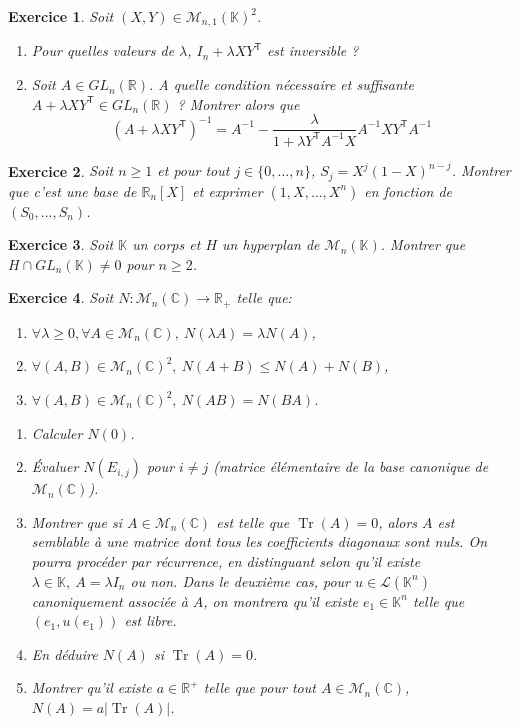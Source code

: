 \documentclass[12pt]{article}
\newtheorem{exercise}{Exercice}[section]
\theoremstyle{remark}
\theoremstyle{remark}
\newcommand{\K}{\mathbb{K}}
\newcommand{\R}{\mathbb{R}}
\newcommand{\C}{\mathbb{C}}
\newcommand{\M}{\mathcal{M}}
\renewcommand{\L}{\mathcal{L}}
\DeclareMathOperator{\Tr}{Tr}
\begin{document}
\begin{exercise}
	Soit $(X,Y)\in\M_{n,1}(\K)^{2}$.
	\begin{enumerate}
		\item Pour quelles valeurs de $\lambda$, $I_{n}+\lambda XY^\mathsf{T}$ est
		inversible ?
		\item Soit $A\in GL_{n}(\R)$. A quelle condition nécessaire et
		suffisante $A+\lambda XY^\mathsf{T}\in GL_{n}(\R)$ ? Montrer alors que 
		$$(A+\lambda XY^\mathsf{T})^{-1}=A^{-1}-\frac{\lambda}{1+\lambda Y^{\mathsf{T}}A^{-1}X}A^{-1}XY^{\mathsf{T}}A^{-1}$$
	\end{enumerate}
\end{exercise}

\begin{exercise}
	Soit $n\geqslant1$ et pour tout $j\in\{0,\dots ,n\}$,
	$S_{j}=X^{j}(1-X)^{n-j}$. Montrer que c'est une base de $\R_{n}[X]$ et
	exprimer $(1,X,\dots,X^{n})$ en fonction de $(S_{0},\dots,S_{n})$.
\end{exercise}

\begin{exercise}
	Soit $\K$ un corps et $H$ un hyperplan de $\M_{n}(\K)$. Montrer que $H\cap
	GL_{n}(\K)\neq 0$ pour $n\geqslant2$.
\end{exercise}

\begin{exercise}
	Soit $N:\M_{n}(\C)\to\R_{+}$ telle que:
	\begin{enumerate}
		\item [(i)] $\forall \lambda\geqslant0,\forall A\in\M_{n}(\C),~N(\lambda
		A)=\lambda N(A)$,
		\item [(ii)] $\forall (A,B)\in\M_{n}(\C)^{2},~N(A+B)\leqslant N(A)+N(B)$,
		\item [(iii)] $\forall (A,B)\in\M_{n}(\C)^{2},~N(AB)=N(BA)$.
	\end{enumerate}
	\begin{enumerate}
		\item Calculer $N(0)$.
		\item Évaluer $N(E_{i,j})$ pour $i\neq j$ (matrice élémentaire de la
		base canonique de $\M_{n}(\C)$).
		\item Montrer que si $A\in\M_{n}(\C)$ est telle que $\Tr(A)=0$, alors
		$A$ est semblable à une matrice dont tous les
		coefficients diagonaux sont nuls. On pourra procéder par récurrence, en
		distinguant selon qu'il existe $\lambda\in\K,~A=\lambda I_{n}$ ou non.
		Dans le deuxième cas, pour $u\in\L(\K^{n})$ canoniquement associée à
		$A$, on montrera qu'il existe $e_{1}\in\K^{n}$ telle que
		$(e_{1},u(e_{1}))$ est libre.
		\item En déduire $N(A)$ si $\Tr(A)=0$.
		\item Montrer qu'il existe $a\in\R^{+}$ telle que pour tout
		$A\in\M_{n}(\C)$, $N(A)=a\vert\Tr(A)\vert$.
	\end{enumerate}
\end{exercise}
\end{document}
